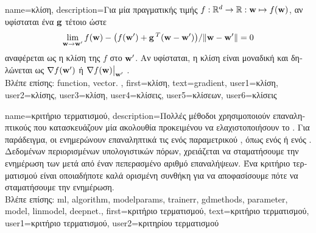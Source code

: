 {name={\foreignlanguage{greek}{κλίση}},
	description={\foreignlanguage{greek}{Για μία} 
		 \foreignlanguage{greek}{πραγματικής τιμής 
		$f: \mathbb{R}^{d} \rightarrow \mathbb{R}: {\bf w} \mapsto f({\bf w})$, 
		αν υφίσταται ένα}  ${\bf g}$ \foreignlanguage{greek}{τέτοιο ώστε 
		$$\lim_{{\bf w} \rightarrow {\bf w}'} {f({\bf w}) - \big(f({\bf w}') + {\bf g}\,^{T} ({\bf w} - {\bf w}') \big) }/{\| {\bf w} - {\bf w}'\|}=0$$
		αναφέρεται ως η κλίση της $f$ στο ${\bf w}'$. Αν υφίσταται, η κλίση είναι μοναδική και δηλώνεται  
		ως $\nabla f({\bf w}')$ ή} $\nabla f({\bf w})\big|_{{\bf w}'}$ \cite{RudinBookPrinciplesMatheAnalysis}.\\
		\foreignlanguage{greek}{Βλέπε επίσης:} \gls{function}, \gls{vector}. },
	first={\foreignlanguage{greek}{κλίση}},
	text={gradient},
	user1={\foreignlanguage{greek}{κλίση}}, %
  	user2={\foreignlanguage{greek}{κλίσης}}, %
	user3={\foreignlanguage{greek}{κλίση}}, %
	user4={\foreignlanguage{greek}{κλίσεις}}, %
  	user5={\foreignlanguage{greek}{κλίσεων}}, %
	user6={\foreignlanguage{greek}{κλίσεις}} %
}

{name={\foreignlanguage{greek}{κριτήριο τερματισμού}},
	description={\foreignlanguage{greek}{Πολλές μέθοδοι} 
		 \foreignlanguage{greek}{χρησιμοποι\-ούν επαναληπτικούς}  
		\foreignlanguage{greek}{που κατασκευάζουν μία ακολουθία}  
		\foreignlanguage{greek}{προκειμένου να ελαχιστοποιήσουν το} . 
		\foreignlanguage{greek}{Για παράδειγμα, οι}  \foreignlanguage{greek}{ενημερώνουν 
		επαναληπτικά τις}  \foreignlanguage{greek}{ενός παραμετρικού} , 
		\foreignlanguage{greek}{όπως ενός}  \foreignlanguage{greek}{ή ενός} . 
		\foreignlanguage{greek}{Δεδομένων περιορισμένων υπολογιστικών πόρων, χρειάζεται να σταματήσουμε
		την ενημέρωση των}  \foreignlanguage{greek}{μετά από έναν
		πεπερασμένο αριθμό επαναλήψεων. Ένα κριτήριο τερματισμού είναι οποιαδήποτε καλά ορισμένη συνθήκη
		για να αποφασίσουμε πότε να σταματήσουμε την ενημέρωση.}  \\
		\foreignlanguage{greek}{Βλέπε επίσης:} \gls{ml}, \gls{algorithm}, \gls{modelparams}, \gls{trainerr}, \gls{gdmethods}, 
		\gls{parameter}, \gls{model}, \gls{linmodel}, \gls{deepnet}.},
	first={\foreignlanguage{greek}{κριτήριο τερματισμού}},
	text={\foreignlanguage{greek}{κριτήριο τερματισμού}},
	user1={\foreignlanguage{greek}{κριτήριο τερματισμού}}, %
	user2={\foreignlanguage{greek}{κριτηρίου τερματισμού}} %
}

